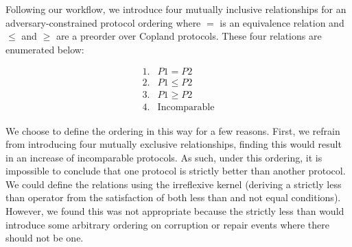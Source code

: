 \documentclass[runningheads]{llncs}
\theoremstyle{definition}
\newcommand{\squash}{\itemsep=0pt\parskip=0pt}
\begin{document}


Following our workflow, we introduce four mutually inclusive relationships for an adversary-constrained protocol ordering where $=$ is an equivalence relation and $\le$ and $\ge$ are a preorder over Copland protocols. These four relations are enumerated below:

\vspace*{-10mm}

\begin{align*}
1. & P1 = P2 \\
2. & P1 \le P2 \\
3. & P1 \ge P2 \\
4. & \text{Incomparable}
\end{align*}

\noindent We choose to define the ordering in this way for a few reasons. First, we refrain from introducing four mutually exclusive relationships, finding this would result in an increase of incomparable protocols. As such, under this ordering, it is impossible to conclude that one protocol is strictly better than another protocol. We could define the relations using the irreflexive kernel (deriving a strictly less than operator from the satisfaction of both less than and not equal conditions). However, we found this was not appropriate because the strictly less than would introduce some arbitrary ordering on corruption or repair events where there should not be one.  
\end{document}

